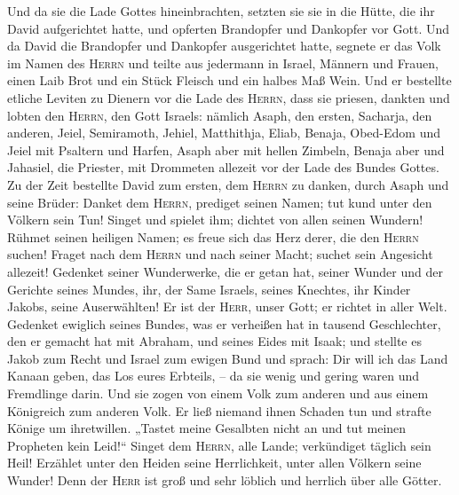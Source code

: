  Und da sie die Lade Gottes hineinbrachten, setzten sie
sie in die Hütte, die ihr David aufgerichtet hatte, und opferten
Brandopfer und Dankopfer vor Gott.  Und da David die
Brandopfer und Dankopfer ausgerichtet hatte, segnete er das Volk im
Namen des \textsc{Herrn}  und teilte aus jedermann in
Israel, Männern und Frauen, einen Laib Brot und ein Stück Fleisch und
ein halbes Maß Wein.  Und er bestellte etliche Leviten zu
Dienern vor die Lade des \textsc{Herrn}, dass sie priesen, dankten und
lobten den \textsc{Herrn}, den Gott Israels:  nämlich
Asaph, den ersten, Sacharja, den anderen, Jeiel, Semiramoth, Jehiel,
Matthithja, Eliab, Benaja, Obed-Edom und Jeiel mit Psaltern und Harfen,
Asaph aber mit hellen Zimbeln,  Benaja aber und Jahasiel,
die Priester, mit Drommeten allezeit vor der Lade des Bundes Gottes.
 Zu der Zeit bestellte David zum ersten, dem
\textsc{Herrn} zu danken, durch Asaph und seine Brüder: 
Danket dem \textsc{Herrn}, prediget seinen Namen; tut kund unter den
Völkern sein Tun!  Singet und spielet ihm; dichtet von
allen seinen Wundern!  Rühmet seinen heiligen Namen; es
freue sich das Herz derer, die den \textsc{Herrn} suchen!
 Fraget nach dem \textsc{Herrn} und nach seiner Macht;
suchet sein Angesicht allezeit!  Gedenket seiner
Wunderwerke, die er getan hat, seiner Wunder und der Gerichte seines
Mundes,  ihr, der Same Israels, seines Knechtes, ihr
Kinder Jakobs, seine Auserwählten!  Er ist der
\textsc{Herr}, unser Gott; er richtet in aller Welt. 
Gedenket ewiglich seines Bundes, was er verheißen hat in tausend
Geschlechter,  den er gemacht hat mit Abraham, und seines
Eides mit Isaak;  und stellte es Jakob zum Recht und
Israel zum ewigen Bund  und sprach: Dir will ich das Land
Kanaan geben, das Los eures Erbteils, --  da sie wenig
und gering waren und Fremdlinge darin.  Und sie zogen von
einem Volk zum anderen und aus einem Königreich zum anderen Volk.
 Er ließ niemand ihnen Schaden tun und strafte Könige um
ihretwillen.  „Tastet meine Gesalbten nicht an und tut
meinen Propheten kein Leid!{}``  Singet dem
\textsc{Herrn}, alle Lande; verkündiget täglich sein Heil!
 Erzählet unter den Heiden seine Herrlichkeit, unter
allen Völkern seine Wunder!  Denn der \textsc{Herr} ist
groß und sehr löblich und herrlich über alle Götter. 
